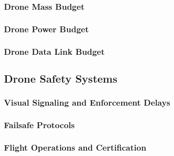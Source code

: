 \subsubsection{Drone Mass Budget}
\label{subsubsec:drone_mass_budget}


\subsubsection{Drone Power Budget}
\label{subsubsec:drone_power_budget}


\subsubsection{Drone Data Link Budget}
\label{subsubsec:drone_data_link_budget}


\subsection{Drone Safety Systems}
\label{subsec:drone_safety_systems}

\subsubsection{Visual Signaling and Enforcement Delays}
\label{subsubsec:visual_signaling_enforcement_delays}


\subsubsection{Failsafe Protocols}
\label{subsubsec:failsafe_protocols}


\subsubsection{Flight Operations and Certification}
\label{subsubsec:flight_operations_certification}

